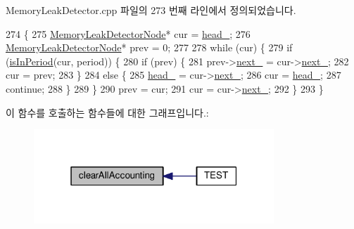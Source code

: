 Memory\+Leak\+Detector.\+cpp 파일의 273 번째 라인에서 정의되었습니다.


\begin{DoxyCode}
274 \{
275     \hyperlink{struct_memory_leak_detector_node}{MemoryLeakDetectorNode}* cur = \hyperlink{struct_memory_leak_detector_list_a8f541a6917dfc908c587dd3f7e86c990}{head\_};
276     \hyperlink{struct_memory_leak_detector_node}{MemoryLeakDetectorNode}* prev = 0;
277 
278     \textcolor{keywordflow}{while} (cur) \{
279         \textcolor{keywordflow}{if} (\hyperlink{struct_memory_leak_detector_list_af38972a8d54f899a1233d80ff0d6f52b}{isInPeriod}(cur, period)) \{
280             \textcolor{keywordflow}{if} (prev) \{
281                 prev->\hyperlink{struct_memory_leak_detector_node_a6a718fbf408f23d29c6ef9167005968c}{next\_} = cur->\hyperlink{struct_memory_leak_detector_node_a6a718fbf408f23d29c6ef9167005968c}{next\_};
282                 cur = prev;
283             \}
284             \textcolor{keywordflow}{else} \{
285                 \hyperlink{struct_memory_leak_detector_list_a8f541a6917dfc908c587dd3f7e86c990}{head\_} = cur->\hyperlink{struct_memory_leak_detector_node_a6a718fbf408f23d29c6ef9167005968c}{next\_};
286                 cur = \hyperlink{struct_memory_leak_detector_list_a8f541a6917dfc908c587dd3f7e86c990}{head\_};
287                 \textcolor{keywordflow}{continue};
288             \}
289         \}
290         prev = cur;
291         cur = cur->\hyperlink{struct_memory_leak_detector_node_a6a718fbf408f23d29c6ef9167005968c}{next\_};
292     \}
293 \}
\end{DoxyCode}


이 함수를 호출하는 함수들에 대한 그래프입니다.\+:
\nopagebreak
\begin{figure}[H]
\begin{center}
\leavevmode
\includegraphics[width=256pt]{struct_memory_leak_detector_list_a6c18f981e1c2139528a10aa573ffeaa9_icgraph}
\end{center}
\end{figure}


